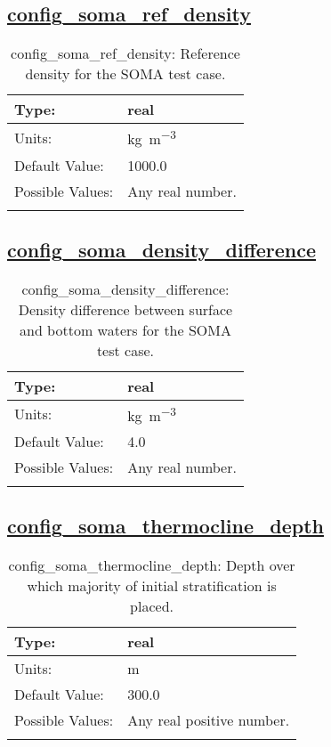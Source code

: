 \subsection[config\_soma\_ref\_density]{\hyperref[sec:nm_tab_soma]{config\_soma\_ref\_density}}
\label{subsec:nm_sec_config_soma_ref_density}
\begin{center}
\begin{longtable}{| p{2.0in} || p{4.0in} |}
    \hline
    Type: & real \\
    \hline
    Units: & \si{kg.m^{-3}} \\
    \hline
    Default Value: & 1000.0 \\
    \hline
    Possible Values: & Any real number. \\
    \hline
    \caption{config\_soma\_ref\_density: Reference density for the SOMA test case.}
\end{longtable}
\end{center}
\subsection[config\_soma\_density\_difference]{\hyperref[sec:nm_tab_soma]{config\_soma\_density\_difference}}
\label{subsec:nm_sec_config_soma_density_difference}
\begin{center}
\begin{longtable}{| p{2.0in} || p{4.0in} |}
    \hline
    Type: & real \\
    \hline
    Units: & \si{kg.m^{-3}} \\
    \hline
    Default Value: & 4.0 \\
    \hline
    Possible Values: & Any real number. \\
    \hline
    \caption{config\_soma\_density\_difference: Density difference between surface and bottom waters for the SOMA test case.}
\end{longtable}
\end{center}
\subsection[config\_soma\_thermocline\_depth]{\hyperref[sec:nm_tab_soma]{config\_soma\_thermocline\_depth}}
\label{subsec:nm_sec_config_soma_thermocline_depth}
\begin{center}
\begin{longtable}{| p{2.0in} || p{4.0in} |}
    \hline
    Type: & real \\
    \hline
    Units: & \si{m} \\
    \hline
    Default Value: & 300.0 \\
    \hline
    Possible Values: & Any real positive number. \\
    \hline
    \caption{config\_soma\_thermocline\_depth: Depth over which majority of initial stratification is placed.}
\end{longtable}
\end{center}
